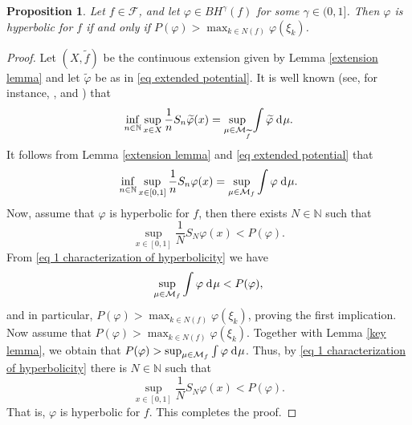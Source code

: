 \documentclass[12pt]{amsart}
\numberwithin{equation}{section} %
\numberwithin{figure}{section} %
\theoremstyle{plain}
\newtheorem{prop}{Proposition}[section]
\theoremstyle{definition}
\theoremstyle{remark}
\theoremstyle{citing}
\newcommand{\N}{\mathbb{N}}
\renewcommand{\=}{\coloneqq}
\newcommand{\dd}{\hspace{1pt}\operatorname{d}\hspace{-1pt}}
\begin{document}
\begin{prop}\label{prop characterization of hyperbolicity}
    Let $f\in \mathscr{F}$, and let $\varphi \in BH^{\gamma}(f)$ for some $\gamma \in (0,1]$. Then $\varphi$ is hyperbolic for $f$ if and only if $P(\varphi)>\max_{k\in N(f)}\varphi(\xi_k)$.
\end{prop}
\begin{proof}
    Let $(X,\widetilde{f})$ be the continuous extension given by Lemma \ref{extension lemma} and let $\widetilde{\varphi}$ be as in \eqref{eq extended potential}. It is well known (see, for instance, \cite[Proposition 3.1]{InoquioRivera}, and \cite[Theorem A.3]{Morris1}) that
    \begin{equation*}
        \inf_{n\in \N} \sup_{x\in X} \frac{1}{n}S_n\widetilde{\varphi}(x) = \sup_{\mu\in \mathcal{M}_{\widetilde{f}}} \int \widetilde{\varphi}\dd\mu.
    \end{equation*}
    It follows from Lemma \ref{extension lemma} and \eqref{eq extended potential} that
    \begin{equation}\label{eq 1 characterization of hyperbolicity}
        \inf_{n\in \N} \sup_{x\in [0,1]}\frac{1}{n} S_n \varphi(x) = \sup_{\mu\in \mathcal{M}_f}\int \varphi \dd\mu.
    \end{equation}
    Now, assume that $\varphi$ is hyperbolic for $f$, then there exists $N\in\N$ such that
    \begin{equation*}\sup_{x\in [0,1]}\frac{1}{N}S_N\varphi(x) < P(\varphi).\end{equation*}
    From \eqref{eq 1 characterization of hyperbolicity} we have
    \begin{equation*}
         \sup_{\mu \in \mathcal{M}_f}\int \varphi \dd\mu<P(\varphi),
    \end{equation*}
    and in particular, $P(\varphi)> \max_{k\in N(f)}\varphi(\xi_k)$, proving the first implication.
    Now assume that $P(\varphi)>\max_{k\in N(f)} \varphi(\xi_k)$. Together with Lemma \ref{key lemma}, we obtain that $P(\varphi)>\sup_{\mu\in \mathcal{M}_f}\int \varphi \dd\mu$. Thus, by \eqref{eq 1 characterization of hyperbolicity} there is $N\in \N$ such that
    \begin{equation*}
         \sup_{x\in[0,1]}\frac{1}{N}S_N \varphi(x)<P(\varphi).
    \end{equation*}
    That is, $\varphi$ is hyperbolic for $f$. This completes the proof.
\end{proof}
\end{document}
